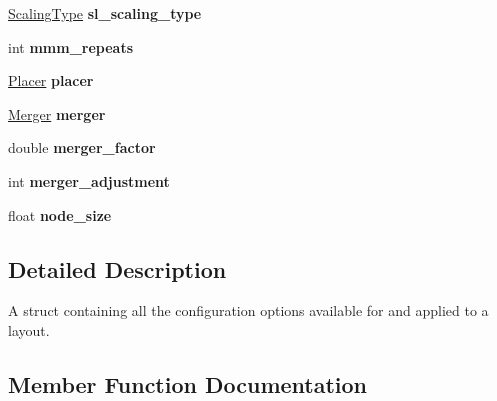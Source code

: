 \begin{DoxyCompactItemize}
\mbox{\label{structLayoutConfiguration_a7975f6fe7f0ca315af9c631a325b98af}} 
\hyperlink{layout_8hh_ae327227c361ab0e868a1f25017cb3ae2}{Scaling\+Type} {\bfseries sl\+\_\+scaling\+\_\+type}
\item 
\mbox{\label{structLayoutConfiguration_a73bfc92692894cafdfa063b0a45bc065}} 
int {\bfseries mmm\+\_\+repeats}
\item 
\mbox{\label{structLayoutConfiguration_a139a9d88f1bcce6769b440f0f49130f0}} 
\hyperlink{layout_8hh_a93e50260439be3f5fe75b271c0ce2c96}{Placer} {\bfseries placer}
\item 
\mbox{\label{structLayoutConfiguration_a70222497c34b2ffa597cd364d0a1d318}} 
\hyperlink{layout_8hh_a87e3986b1a6733e81a1c0b4bbd6aba18}{Merger} {\bfseries merger}
\item 
\mbox{\label{structLayoutConfiguration_a98f6187e2dc15b0f06bcbfef5562beae}} 
double {\bfseries merger\+\_\+factor}
\item 
\mbox{\label{structLayoutConfiguration_a382a084c8d4785151b9328221c4ba132}} 
int {\bfseries merger\+\_\+adjustment}
\item 
\mbox{\label{structLayoutConfiguration_a54a32d5173963abca63aae5bfa9d68e1}} 
float {\bfseries node\+\_\+size}
\end{DoxyCompactItemize}


\subsection{Detailed Description}
A struct containing all the configuration options available for and applied to a layout. 

\subsection{Member Function Documentation}
\mbox{\label{structLayoutConfiguration_a8be8ea09a3143cf9ba54a5069f0934d1}} 
